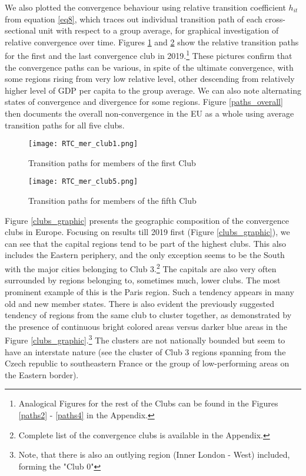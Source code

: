 \documentclass[11pt]{article}
\begin{document}
We also plotted the convergence behaviour using relative transition coefficient $h_{it}$ from equation \ref{eq8}, which traces out individual transition path of each cross-sectional unit with respect to a group average, for graphical investigation of relative convergence over time. Figures \ref{paths1} and \ref{paths5} show the relative transition paths for the first and the last convergence club in 2019.\footnote{Analogical Figures for the rest of the Clubs can be found in the Figures \ref{paths2} - \ref{paths4} in the Appendix.} These pictures confirm that the convergence paths can be various, in spite of the ultimate convergence, with some regions rising from very low relative level, other descending from relatively higher level of GDP per capita to the group average. We can also note alternating states of convergence and divergence for some regions. Figure \ref{paths_overall} then documents the overall non-convergence in the EU as a whole using average transition paths for all five clubs.

\begin{figure}[!htbp]%
    \centering
    \texttt{[image: RTC\_mer\_club1.png]}
    \caption{Transition paths for members of the first Club}
    \label{paths1}
\end{figure}

\begin{figure}[!htbp]%
    \centering
    \texttt{[image: RTC\_mer\_club5.png]}
    \caption{Transition paths for members of the fifth Club }
    \label{paths5}
\end{figure}


Figure \ref{clubs_graphic} presents the geographic composition of the convergence clubs in Europe. Focusing on results till 2019 first (Figure \ref{clubs_graphic}), we can see that the capital regions tend to be part of the highest clubs. This also includes the Eastern periphery, and the only exception seems to be the South with the major cities belonging to Club 3.\footnote{Complete list of the convergence clubs is available in the Appendix.} The capitals are also very often surrounded by regions belonging to, sometimes much, lower clubs. The most prominent example of this is the Paris region. Such a tendency appears in many old and new member states. There is also evident the previously suggested tendency of regions from the same club to cluster together, as demonstrated by the presence of continuous bright colored areas versus darker blue areas in the Figure \ref{clubs_graphic}.\footnote{Note, that there is also an outlying region (Inner London - West) included, forming the "Club 0"} The clusters are not nationally bounded but seem to have an interstate nature (see the cluster of Club 3 regions spanning from the Czech republic to southeastern France or the group of low-performing areas on the Eastern border).
\end{document}

